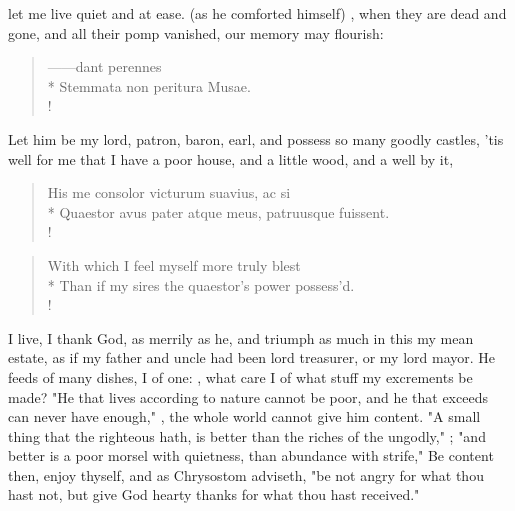 {let me live quiet and at ease.  (as he comforted himself) , when they are dead and gone, and all their pomp vanished, our memory may flourish:

\begin{latin}
\begin{verse}%
------dant perennes\\*
Stemmata non peritura Musae.\\!
\end{verse}%
\end{latin}

Let him be my lord, patron, baron, earl, and possess so many goodly castles, 'tis well for me that I have a poor house, and a little wood, and a well by it, \etc{}

\begin{latin}
\begin{verse}%
His me consolor victurum suavius, ac si\\*
Quaestor avus pater atque meus, patruusque fuissent.\\!
\end{verse}%
\end{latin}



\begin{verse}%
With which I feel myself more truly blest\\*
Than if my sires the quaestor's power possess'd.\\!
\end{verse}%

I live, I thank God, as merrily as he, and triumph as much in this my mean estate, as if my father and uncle had been lord treasurer, or my lord mayor. He feeds of many dishes, I of one: , what care I of what stuff my excrements be made? "He that lives according to nature cannot be poor, and he that exceeds can never have enough," , the whole world cannot give him content. "A small thing that the righteous hath, is better than the riches of the ungodly," ; "and better is a poor morsel with quietness, than abundance with strife,"  Be content then, enjoy thyself, and as Chrysostom adviseth, "be not angry for what thou hast not, but give God hearty thanks for what thou hast received."

}

